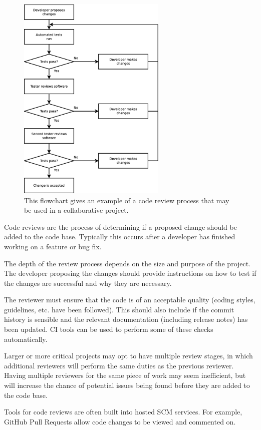 \documentclass[jnr]{iosart2x}
\begin{document}
\begin{figure}
    \centering
    \includegraphics[height=10cm]{code_review_process.eps}
    \caption{This flowchart gives an example of a code review process that may be used in a collaborative project.}
    \label{Code_Review_Process}
\end{figure}

Code reviews  are the process of determining if a proposed change should be added to the code base.
Typically this occurs after a developer has finished working on a feature or bug fix.

The depth of the review process depends on the size and purpose of the project.
The developer proposing the changes should provide instructions on how to test if the changes are successful and why they are necessary.

The reviewer must ensure that the code is of an acceptable quality (coding styles, guidelines, etc. have been followed).
This should also include if the commit history is sensible and the relevant documentation (including release notes) has been updated.
CI tools can be used to perform some of these checks automatically.

Larger or more critical projects may opt to have multiple review stages, in which additional reviewers will perform the same duties as the previous reviewer.
Having multiple reviewers for the same piece of work may seem inefficient, but will increase the chance of potential issues being found before they are added to the code base.

Tools for code reviews are often built into hosted SCM services.
For example, GitHub Pull Requests allow code changes to be viewed and commented on.
\end{document}
